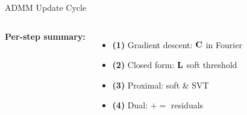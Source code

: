 \begin{frame}{ADMM Update Cycle \skipbadge{}}

  \begin{columns}[T]
      \vspace{0.3em}
      \centering
      

      \vspace{0.3em}
      \small
      \textbf{Per-step summary:}

      \vspace{0.3em}
      \begin{itemize}
        \setlength{\itemsep}{0.15em}
        \item \textbf{(1)} Gradient descent: $\mathbf{C}$ in Fourier
        \item \textbf{(2)} Closed form: $\mathbf{L}$ soft threshold
        \item \textbf{(3)} Proximal: soft \& SVT
        \item \textbf{(4)} Dual: $+= $ residuals
      \end{itemize}
  \end{columns}
\end{frame}
